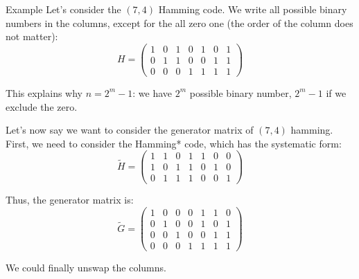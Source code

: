 \documentclass[a4paper]{article}
\begin{document}
\begin{parag}{Example}
    Let's consider the $\left(7, 4\right)$ Hamming code. We write all possible binary numbers in the columns, except for the all zero one (the order of the column does not matter): 
    \[H = \begin{pmatrix} 1 & 0 & 1 & 0 & 1 & 0 & 1 \\ 0 & 1 & 1 & 0 & 0 & 1 & 1 \\ 0 & 0 & 0 & 1 & 1 & 1 & 1 \end{pmatrix} \]
    
    This explains why $n = 2^m - 1$: we have $2^m$ possible binary number, $2^m - 1$ if we exclude the zero.

    Let's now say we want to consider the generator matrix of $\left(7, 4\right)$ hamming. First, we need to consider the Hamming* code, which has the systematic form: 
    \[\widetilde{H} =  \begin{pmatrix} 1 & 1 & 0 & 1 & 1 & 0 & 0 \\ 1 & 0 & 1 & 1 & 0 & 1 & 0 \\ 0 & 1 & 1 & 1 & 0 & 0 & 1 \end{pmatrix} \]

    Thus, the generator matrix is: 
    \[\widetilde{G} = \begin{pmatrix} 1 & 0 & 0 & 0 & 1 & 1 & 0 \\ 0 & 1 & 0 & 0 & 1 & 0 & 1 \\ 0 & 0 & 1 & 0 & 0 & 1 & 1 \\ 0 & 0 & 0 & 1 & 1 & 1 & 1 \end{pmatrix} \]
    
    We could finally unswap the columns.
\end{parag}
\end{document}
